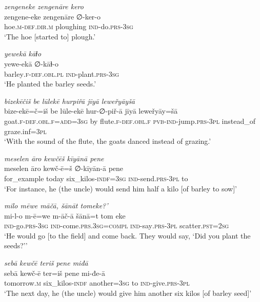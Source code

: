 \ea \label{ŽP.35}
\textit{zengeneke zengenāre kero} \\ 
\gll zengene-eke zengenāre ∅-ker-o \\ 
 hoe\textsc{.m}\textsc{-def}\textsc{.dir}\textsc{.m} ploughing \textsc{ind-}do\textsc{.prs}\textsc{-3sg} \\ 
\glt `The hoe [started to] plough.'
\z 
 
\ea \label{ŽP.36}
\textit{yewekā kāɫo} \\ 
\gll yewe-ekā ∅-kāɫ-o \\ 
 barley\textsc{.f}\textsc{-def}\textsc{.obl}\textsc{.pl} \textsc{ind-}plant\textsc{.prs}\textsc{-3sg} \\ 
\glt `He planted the barley seeds.'
\z 
 
\ea \label{ŽP.37}
\textit{bizekēčiš be lūlekē hurpiřā jīyā leweřyāyšā} \\ 
\gll bize-ekē=č=iš be lūle-ekē hur-∅-piř-ā jīyā leweřyāy=šā \\ 
 goat\textsc{.f}\textsc{-def}\textsc{.obl}\textsc{.f}\textsc{=add}\textsc{=3sg} by flute\textsc{.f}\textsc{-def}\textsc{.obl}\textsc{.f} \textsc{pvb-}\textsc{ind-}jump\textsc{.prs}\textsc{-3pl} instead\_of graze.inf\textsc{=3pl} \\ 
\glt `With the sound of the flute, the goats danced instead of grazing.'
\z 
 
\ea \label{ŽP.38}
\textit{meselen āro kewčēš kīyānā pene} \\ 
\gll meselen āro kewč-ē=š ∅-kīyān-ā pene \\ 
 for\_example today six\_kilos\textsc{-indf}\textsc{=3sg} \textsc{ind-}send\textsc{.prs}\textsc{-3pl} to \\ 
\glt `For instance, he (the uncle) would send him half a kilo [of barley to sow]'
\z 
 
\ea \label{ŽP.39}
\textit{milo mēwe māčā, šānāt tomeke?’} \\ 
\gll mi-l-o m-ē=we m-āč-ā šānā=t tom eke \\ 
 \textsc{ind-}go\textsc{.prs}\textsc{-3sg} \textsc{ind-}come\textsc{.prs}\textsc{.3sg}\textsc{=compl} \textsc{ind-}say\textsc{.prs}\textsc{-3pl} scatter\textsc{.pst}\textsc{=\textsc{2sg}} \\ 
\glt `He would go [to the field] and come back. They would say, ‘Did you plant the seeds?’'
\z 
 
\ea \label{ŽP.41}
\textit{sebā kewčē teriš pene miđā} \\ 
\gll sebā kewč-ē ter=iš pene mi-đe-ā \\ 
 tomorrow\textsc{.m} six\_kilos\textsc{-indf} another\textsc{=3sg} to \textsc{ind-}give\textsc{.prs}\textsc{-3pl} \\ 
\glt `The next day, he (the uncle) would give him another six kilos [of barley seed]'
\z 
 
